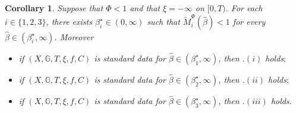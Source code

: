 \documentclass[10pt]{article} %
\newtheorem{corollary}[theorem]{Corollary}
\def \G{\mathbb{G}}
\begin{document}
\begin{corollary}\label{cor::main_result_bsde}
Suppose that $\Phi < 1$ and that $\xi = -\infty$ on $[0,T)$. For each $i \in \{1,2,3\}$, there exists $\beta^\star_i \in (0,\infty)$ such that $\widetilde M^\Phi_i(\hat\beta) <1$ for every $\hat\beta \in (\beta^\star_i,\infty)$. Moreover
	\begin{itemize}
		\item[$(i)$] if $(X,\G,T,\xi,f,C)$ is standard data for $\hat\beta \in (\beta^\star_1,\infty)$, then {\rm{}.$(i)$} holds$;$
		\item[$(ii)$] if $(X,\G,T,\xi,f,C)$ is standard data for $\hat\beta \in (\beta^\star_2,\infty)$, then {\rm{}.$(ii)$} holds$;$
		\item[$(iii)$] if $(X,\G,T,\xi,f,C)$ is standard data for $\hat\beta \in (\beta^\star_3,\infty)$, then {\rm{}.$(iii)$} holds.
	\end{itemize}
\end{corollary}
\end{document}
